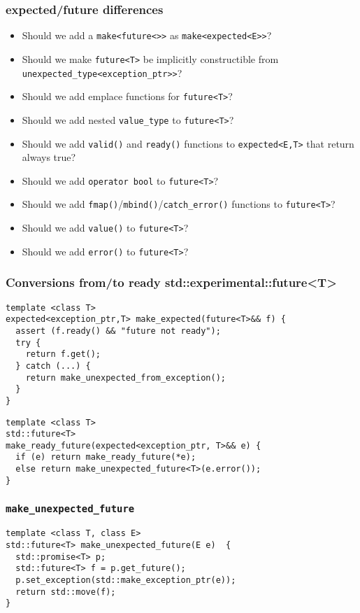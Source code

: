 \documentclass[xcolor=dvipsnames]{beamer}
\newcommand{\cpp}[1]{\lstinline{#1}}
\begin{document}
\begin{frame}[fragile]
\frametitle{expected/future differences}

\begin{itemize}
\item Should we add a \cpp{make<future<>>} as \cpp{make<expected<E>>}?
\item Should we make \cpp{future<T>} be implicitly constructible from \cpp{unexpected_type<exception_ptr>>}?
\item Should we add emplace functions for \cpp{future<T>}?
\item Should we add nested \cpp{value_type} to \cpp{future<T>}?
\item Should we add  \cpp{valid()} and \cpp{ready()} functions to \cpp{expected<E,T>} that return always true?
\item Should we add  \cpp{operator bool} to \cpp{future<T>}?
\item Should we add  \cpp{fmap()}/\cpp{mbind()}/\cpp{catch_error()}  functions to \cpp{future<T>}?
\item Should we add  \cpp{value()} to \cpp{future<T>}?
\item Should we add  \cpp{error()} to \cpp{future<T>}?
\end{itemize}

\end{frame}
\begin{frame}[fragile]
\frametitle{Conversions from/to ready std::experimental::future<T> }

\begin{lstlisting}
template <class T>
expected<exception_ptr,T> make_expected(future<T>&& f) {
  assert (f.ready() && "future not ready");
  try {
    return f.get();
  } catch (...) {
    return make_unexpected_from_exception();
  }
}
\end{lstlisting}

\begin{lstlisting}
template <class T>
std::future<T> 
make_ready_future(expected<exception_ptr, T>&& e) {
  if (e) return make_ready_future(*e);
  else return make_unexpected_future<T>(e.error()); 
}
\end{lstlisting}
\end{frame}

\begin{frame}[fragile]
\frametitle{\cpp{make_unexpected_future} }

\begin{lstlisting}
template <class T, class E>
std::future<T> make_unexpected_future(E e)  {
  std::promise<T> p;
  std::future<T> f = p.get_future();
  p.set_exception(std::make_exception_ptr(e));
  return std::move(f);
}
\end{lstlisting}

\end{frame}
\end{document}
